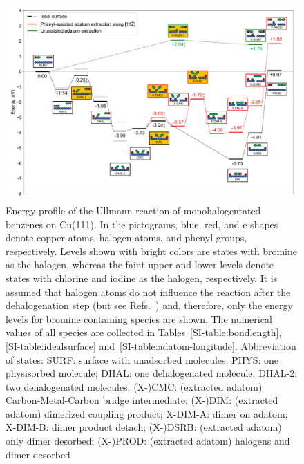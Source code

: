 \documentclass[aps,prb,amsmath,amssymb,11pt]{revtex4-1}
\newcommand{\zhzh}{\color{blue}}
\newcommand{\zhzh}{\color{blue}}
\begin{document}
\begin{figure}[bt]
\centering
\includegraphics[width=1.\textwidth]{Fig/main-profile.pdf}
\caption{
Energy profile of the Ullmann reaction of monohalogentated benzenes on Cu(111). In the pictograms, blue, red, and e shapes denote copper atoms, halogen atoms, and phenyl groups, respectively. %
Levels shown with bright colors are states with bromine as the halogen, whereas the faint upper and lower levels denote states with chlorine and iodine as the halogen, respectively. It is assumed that halogen atoms do not influence the reaction after the dehalogenation step (but see Refs.~) and, therefore, only the energy levels for bromine containing species are shown. The numerical values of all species are collected in Tables~\ref{SI-table:bondlength}, \ref{SI-table:idealsurface} and~\ref{SI-table:adatom-longitude}. {\zhzh Abbreviation of states: SURF: surface with unadsorbed molecules; PHYS: one physisorbed molecule; DHAL: one dehalogenated molecule; DHAL-2: two dehalogenated molecules; (X-)CMC: (extracted adatom) Carbon-Metal-Carbon bridge intermediate; (X-)DIM: (extracted adatom) dimerized coupling product; X-DIM-A: dimer on adatom; X-DIM-B: dimer product detach; (X-)DSRB: (extracted adatom) only dimer desorbed; (X-)PROD: (extracted adatom) halogens and dimer desorbed}}
\label{fig:completeenergy}
\end{figure}
\end{document}
